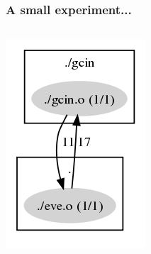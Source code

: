 \begin{frame}[plain]
	\frametitle{A small experiment...}
	\begin{columns}
		\begin{center}
			\includegraphics[scale=.4]{xim-demo-a.png}
		\end{center}


\end{columns}
\end{frame}
